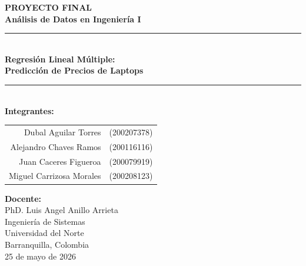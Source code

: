 \documentclass[12pt,a4paper]{article}
\begin{document}
\begin{titlepage}

    
    \vspace*{0.7cm}
    
    \begin{center}
        {\Huge\bfseries\textcolor{azuloscuro}{PROYECTO FINAL}}\\[0.5cm]
        {\LARGE\bfseries\textcolor{azulclaro}{Análisis de Datos en Ingeniería I}}\\[1cm]
        
        \rule{0.8\textwidth}{1.5pt}\\[0.8cm]
        
        {\Large\textbf{Regresión Lineal Múltiple:}}\\[0.3cm]
        {\Large\textbf{Predicción de Precios de Laptops}}\\[1.5cm]
        
        \rule{0.6\textwidth}{0.5pt}\\[1cm]
        
        {\large\textbf{Integrantes:}}\\[0.5cm]
        \begin{tabular}{rl}
            Dubal Aguilar Torres & (200207378) \\
            Alejandro Chaves Ramos & (200116116) \\
            Juan Caceres Figueroa & (200079919) \\
            Miguel Carrizosa Morales & (200208123) \\
        \end{tabular}
        
        \vfill
        
        {\large\textbf{Docente:}}\\[0.3cm]
        PhD. Luis Angel Anillo Arrieta\\[1cm]
        
        {\large Ingeniería de Sistemas}\\[0.3cm]
        {\large Universidad del Norte}\\[0.3cm]
        {\large Barranquilla, Colombia}\\[0.5cm]
        {\large 25 de mayo de 2026}
        
    \end{center}
\end{titlepage}
\end{document}
